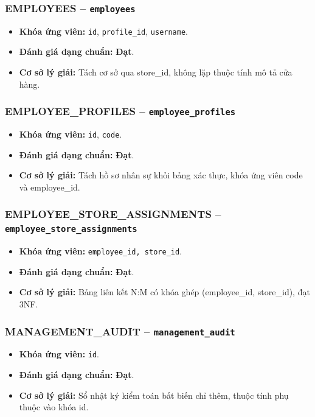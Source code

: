 \subsubsection{EMPLOYEES -- \texttt{employees}}
\begin{itemize}
  \item \textbf{Khóa ứng viên:} \texttt{id}, \texttt{profile\_id}, \texttt{username}.
  \item \textbf{Đánh giá dạng chuẩn:} \textbf{Đạt}.
  \item \textbf{Cơ sở lý giải:} Tách cơ sở qua store_id, không lặp thuộc tính mô tả cửa hàng.
\end{itemize}

\subsubsection{EMPLOYEE_PROFILES -- \texttt{employee\_profiles}}
\begin{itemize}
  \item \textbf{Khóa ứng viên:} \texttt{id}, \texttt{code}.
  \item \textbf{Đánh giá dạng chuẩn:} \textbf{Đạt}.
  \item \textbf{Cơ sở lý giải:} Tách hồ sơ nhân sự khỏi bảng xác thực, khóa ứng viên code và employee_id.
\end{itemize}

\subsubsection{EMPLOYEE_STORE_ASSIGNMENTS -- \texttt{employee\_store\_assignments}}
\begin{itemize}
  \item \textbf{Khóa ứng viên:} \texttt{employee\_id, store\_id}.
  \item \textbf{Đánh giá dạng chuẩn:} \textbf{Đạt}.
  \item \textbf{Cơ sở lý giải:} Bảng liên kết N:M có khóa ghép (employee_id, store_id), đạt 3NF.
\end{itemize}

\subsubsection{MANAGEMENT_AUDIT -- \texttt{management\_audit}}
\begin{itemize}
  \item \textbf{Khóa ứng viên:} \texttt{id}.
  \item \textbf{Đánh giá dạng chuẩn:} \textbf{Đạt}.
  \item \textbf{Cơ sở lý giải:} Sổ nhật ký kiểm toán bất biến chỉ thêm, thuộc tính phụ thuộc vào khóa id.
\end{itemize}

